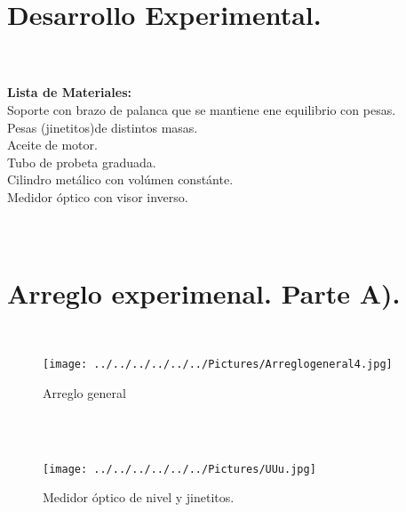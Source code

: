 \documentclass[10pt,a4paper]{article}
\begin{document}
\section*{Desarrollo Experimental.}\\

 \\
\textbf{Lista de Materiales:} \\
Soporte con brazo de palanca que se mantiene ene equilibrio con pesas.\\
Pesas (jinetitos)de distintos masas.\\
Aceite de motor.\\
Tubo de probeta graduada.\\
Cilindro met\'{a}lico con vol\'{u}men const\'{a}nte.\\
Medidor \'{o}ptico con visor inverso.  \\
\\
\\
\section*{Arreglo experimenal. Parte A).} \\

\begin{figure}[hbtp]
\centering
\texttt{[image: ../../../../../../Pictures/Arreglogeneral4.jpg]}  
\caption{Arreglo general}
\end{figure}
\\
\\
\begin{figure}[hbtp]
\centering
\texttt{[image: ../../../../../../Pictures/UUu.jpg]} 
\caption{Medidor \'{o}ptico de nivel y jinetitos.}
\end{figure}

\pagebreak
\end{document}
